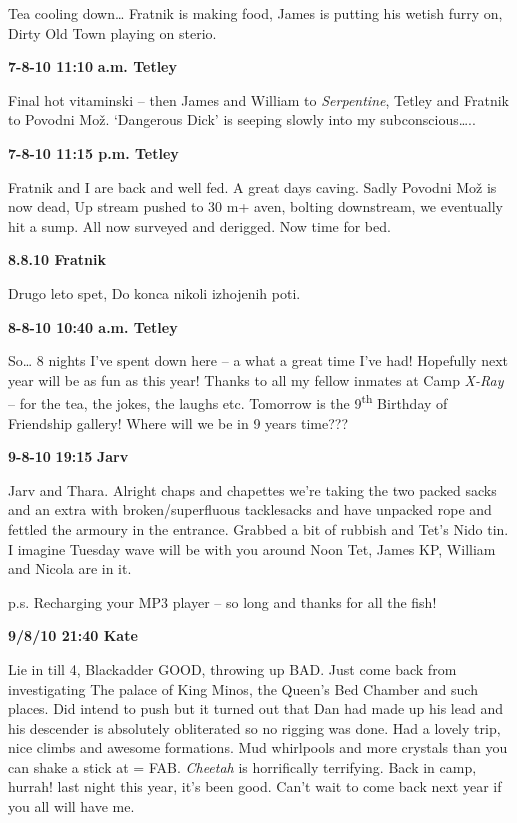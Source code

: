 Tea cooling down\ldots{} Fratnik is making food, James is putting his
wetish furry on, Dirty Old Town playing on sterio.

\textbf{7-8-10 11:10} \textbf{a.m. Tetley}

Final hot vitaminski -- then James and William to \emph{Serpentine},
Tetley and Fratnik to Povodni Mož. `Dangerous Dick' is seeping slowly
into my subconscious\ldots{}..

\textbf{7-8-10 11:15 p.m. Tetley}

Fratnik and I are back and well fed. A great days caving. Sadly Povodni
Mož is now dead, Up stream pushed to 30 m+ aven, bolting downstream, we
eventually hit a sump. All now surveyed and derigged. Now time for bed.

\textbf{8.8.10 Fratnik}

Drugo leto spet, Do konca nikoli izhojenih poti.

\textbf{8-8-10 10:40 a.m. Tetley}

So\ldots{} 8 nights I've spent down here -- a what a great time I've
had! Hopefully next year will be as fun as this year! Thanks to all my
fellow inmates at Camp \emph{X-Ray} -- for the tea, the jokes, the
laughs etc. Tomorrow is the 9\textsuperscript{th} Birthday of Friendship
gallery! Where will we be in 9 years time???

\textbf{9-8-10} \textbf{19:15} \textbf{Jarv}

Jarv and Thara. Alright chaps and chapettes we're taking the two packed
sacks and an extra with broken/superfluous tacklesacks and have unpacked
rope and fettled the armoury in the entrance. Grabbed a bit of rubbish
and Tet's Nido tin. I imagine Tuesday wave will be with you around Noon
Tet, James KP, William and Nicola are in it.

p.s. Recharging your MP3 player -- so long and thanks for all the fish!

\textbf{9/8/10 21:40 Kate}

Lie in till 4, Blackadder GOOD, throwing up BAD. Just come back from
investigating The palace of King Minos, the Queen's Bed Chamber and such
places. Did intend to push but it turned out that Dan had made up his
lead and his descender is absolutely obliterated so no rigging was done.
Had a lovely trip, nice climbs and awesome formations. Mud whirlpools
and more crystals than you can shake a stick at = FAB. \emph{Cheetah} is
horrifically terrifying. Back in camp, hurrah! last night this year,
it's been good. Can't wait to come back next year if you all will have
me.

